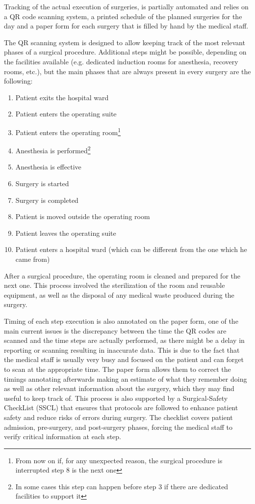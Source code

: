 Tracking of the actual execution of surgeries, is partially automated and relies on a QR code scanning system, a printed schedule of the planned surgeries for the day and a paper form for each surgery that is filled by hand by the medical staff.

The QR scanning system is designed to allow keeping track of the most relevant phases of a surgical procedure.
Additional steps might be possible, depending on the facilities available (e.g. dedicated induction rooms for anesthesia, recovery rooms, etc.), but the main phases that are always present in every surgery are the following:

\begin{enumerate}
    \item Patient exits the hospital ward
    \item Patient enters the operating suite
    \item Patient enters the operating room\footnote{From now on if, for any unexpected reason, the surgical procedure is interrupted step 8 is the next one}  %
    \item Anesthesia is performed\footnote{In some cases this step can happen before step 3 if there are dedicated facilities to support it}
    \item Anesthesia is effective
    \item Surgery is started
    \item Surgery is completed
    \item Patient is moved outside the operating room
    \item Patient leaves the operating suite
    \item Patient enters a hospital ward (which can be different from the one which he came from)
\end{enumerate}
%
After a surgical procedure, the operating room is cleaned and prepared for the next one.
This process involved the sterilization of the room and reusable equipment, as well as the disposal of any medical waste produced during the surgery.

Timing of each step execution is also annotated on the paper form,
one of the main current issues is the discrepancy between the time the QR codes are scanned and the time steps are actually performed, as there might be a delay in reporting or scanning resulting in inaccurate data.
%
This is due to the fact that the medical staff is usually very busy and focused on the patient and can forget to scan at the appropriate time.
The paper form allows them to correct the timings annotating afterwards making an estimate of what they remember doing as well as other relevant information about the surgery, which they may find useful to keep track of.
%
This process is also supported by a Surgical-Safety CheckList (SSCL) that ensures that protocols are followed to enhance patient safety and reduce risks of errors during surgery.
%
The checklist covers patient admission, pre-surgery, and post-surgery phases, forcing the medical staff to verify critical information at each step. 


